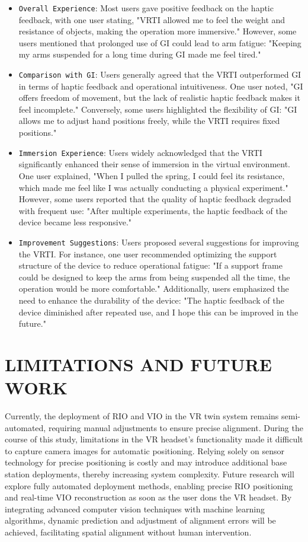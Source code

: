 \documentclass[runningheads]{llncs}
\begin{document}
\begin{itemize}
  \item {\texttt{Overall Experience}}: Most users gave positive feedback on the haptic feedback, with one user stating, "VRTI allowed me to feel the weight and resistance of objects, making the operation more immersive." However, some users mentioned that prolonged use of GI could lead to arm fatigue: "Keeping my arms suspended for a long time during GI made me feel tired."

  \item {\texttt{Comparison with GI}}: Users generally agreed that the VRTI outperformed GI in terms of haptic feedback and operational intuitiveness. One user noted, "GI offers freedom of movement, but the lack of realistic haptic feedback makes it feel incomplete." Conversely, some users highlighted the flexibility of GI: "GI allows me to adjust hand positions freely, while the VRTI requires fixed positions."

  \item {\texttt{Immersion Experience}}: Users widely acknowledged that the VRTI significantly enhanced their sense of immersion in the virtual environment. One user explained, "When I pulled the spring, I could feel its resistance, which made me feel like I was actually conducting a physical experiment." However, some users reported that the quality of haptic feedback degraded with frequent use: "After multiple experiments, the haptic feedback of the device became less responsive."

  \item {\texttt{Improvement Suggestions}}: Users proposed several suggestions for improving the VRTI. For instance, one user recommended optimizing the support structure of the device to reduce operational fatigue: "If a support frame could be designed to keep the arms from being suspended all the time, the operation would be more comfortable." Additionally, users emphasized the need to enhance the durability of the device: "The haptic feedback of the device diminished after repeated use, and I hope this can be improved in the future."
\end{itemize}

\section{LIMITATIONS AND FUTURE WORK}
Currently, the deployment of RIO and VIO in the VR twin system remains semi-automated, requiring manual adjustments to ensure precise alignment. During the course of this study, limitations in the VR headset's functionality made it difficult to capture camera images for automatic positioning. Relying solely on sensor technology for precise positioning is costly and may introduce additional base station deployments, thereby increasing system complexity. Future research will explore fully automated deployment methods, enabling precise RIO positioning and real-time VIO reconstruction as soon as the user dons the VR headset. By integrating advanced computer vision techniques with machine learning algorithms, dynamic prediction and adjustment of alignment errors will be achieved, facilitating spatial alignment without human intervention.
\end{document}
